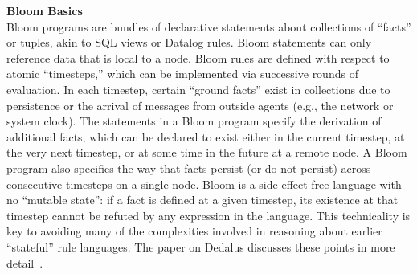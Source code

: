 \vspace{9pt}\noindent\textbf{Bloom Basics}\\
Bloom programs are bundles of declarative statements about collections of ``facts'' or tuples, akin to SQL views or Datalog rules.  Bloom statements can only reference data that is local to a node.  Bloom rules are defined with respect to atomic ``timesteps,'' which can be implemented via successive rounds of evaluation. In each timestep, certain ``ground facts'' exist in collections due to persistence or the arrival of messages from outside agents (e.g., the network or system clock).  The statements in a Bloom program specify the derivation of additional facts, which can be declared to exist either in the current timestep, at the very next timestep, or at some time in the future at a remote node.  A Bloom program also specifies the way that facts persist (or do not persist) across consecutive timesteps on a single node.  Bloom is a side-effect free language with no ``mutable state'': if a fact is defined at a given timestep, its existence at that timestep cannot be refuted by any expression in the language.  This technicality is key to avoiding many of the complexities involved in reasoning about earlier ``stateful'' rule languages.  The paper on Dedalus discusses these points in more detail~\cite{dedalus}.


